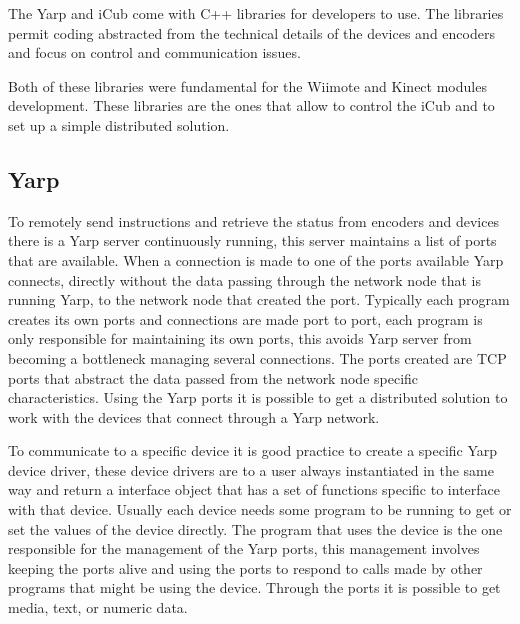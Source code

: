	The Yarp and iCub come with C++ libraries for developers to use. The libraries permit coding abstracted from the technical details of the devices and encoders and focus on control and communication issues.
	
	Both of these libraries were fundamental for the \ac{Wiimote} and Kinect modules development. These libraries are the ones that allow to control the iCub and to set up a simple distributed solution.
	
\subsection{Yarp}

	To remotely send instructions and retrieve the status from encoders and devices there is a Yarp server continuously running, this server maintains a list of ports that are available. When a connection is made to one of the ports available Yarp connects, directly without the data passing through the network node that is running Yarp, to the network node that created the port. Typically each program creates its own ports and connections are made port to port, each program is only responsible for maintaining its own ports, this avoids Yarp server from becoming a bottleneck managing several connections. The ports created are \ac{TCP} ports that abstract the data passed from the network node specific characteristics. Using the \ac{Yarp} ports it is possible to get a distributed solution to work with the devices that connect through a Yarp network.

	To communicate to a specific device it is good practice to create a specific Yarp device driver, these device drivers are to a user always instantiated in the same way and return a interface object that has a set of functions specific to interface with that device. Usually each device needs some program to be running to get or set the values of the device directly. The program that uses the device is the one responsible for the management of the Yarp ports, this management involves keeping the ports alive and using the ports to respond to calls made by other programs that might be using the device. Through the ports it is possible to get media, text, or numeric data.
	
